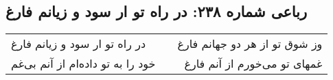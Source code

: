 \begin{center}
\section*{رباعی شماره ۲۳۸: در راه تو ار سود و زیانم فارغ}
\label{sec:sh238}
\begin{longtable}{l p{0.5cm} r}
در راه تو ار سود و زیانم فارغ
&&
وز شوق تو از هر دو جهانم فارغ
\\
خود را به تو داده‌ام از آنم بی‌غم
&&
غمهای تو می‌خورم از آنم فارغ
\\
\end{longtable}
\end{center}
